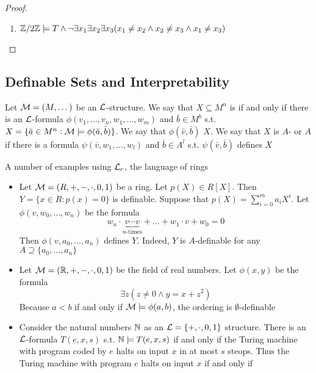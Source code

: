 \documentclass[11pt]{article}
\begin{document}
\begin{proof}
\begin{enumerate}
\item \(\mathbb{Z}/2\mathbb{Z}\models T\wedge\neg\exists x_1\exists x_2\exists x_3(x_1\neq x_2\wedge
      x_2\neq x_3\wedge x_1\neq x_3)\)
\end{enumerate}
\end{proof}
\subsection{Definable Sets and Interpretability}
\label{sec:org377de4b}
\begin{definition}[]
Let \(\mathcal{M}=(M,\dots)\) be an \(\mathcal{L}\)-structure. We say that \(X\subseteq M^n\)
is  if and only if there is an \(\mathcal{L}\)-formula 
\(\phi(v_1,\dots,v_n,w_1,\dots,w_m)\) and \(\bar{b}\in M^b\) s.t. 
\(X=\{\bar{a}\in M^n:\mathcal{M}\models\phi(\bar{a},\bar{b})\}\). We say that
\(\phi(\bar{v},\bar{b})\)  \(X\). We say that \(X\) is
\(A\)- or   \(A\) if there is a formula 
\(\psi(\bar{v},w_1,\dots,w_l)\) and \(\bar{b}\in A^l\) s.t.
\(\psi(\bar{v},\bar{b})\) defines \(X\)
\end{definition}

A number of examples using \(\mathcal{L}_r\), the language of rings
\begin{itemize}
\item Let \(\mathcal{M}=(R,+,-,\cdot,0,1)\) be a ring. Let \(p(X)\in R[X]\). Then 
\(Y=\{x\in R:p(x)=0\}\) is definable. Suppose that
\(p(X)=\displaystyle\sum_{i=0}^ma_iX^i\). Let \(\phi(v,w_0,\dots,w_n)\) be the
formula
\begin{equation*}
w_n\cdot\underbrace{v\cdots v}_{n\text{-times}}+\dots+w_1\cdot v+w_0=0
\end{equation*}
Then \(\phi(v,a_0,\dots,a_n)\) defines \(Y\). Indeed, \(Y\) is \(A\)-definable
for any \(A\supseteq\{a_0,\dots,a_n\}\)
\item Let \(\mathcal{M}=(\mathbb{R},+,-,\cdot,0,1)\) be the field of real numbers. Let
\(\phi(x,y)\) be the formula 
\begin{equation*}
\exists z(z\neq 0\wedge y=x+z^2)
\end{equation*}
Because \(a<b\) if and only if \(\mathcal{M}\models\phi(a,b)\), the ordering is
\(\emptyset\)-definable
\item Consider the natural numbers \(\mathbb{N}\) as an \(\mathcal{L}=\{+,\cdot,0,1\}\) structure.
There is an \(\mathcal{L}\)-formula \(T(e,x,s)\) s.t. \(\mathbb{N}\models T(e,x,s)\) if and
only if the Turing machine with program coded by \(e\) halts on input \(x\) in
at most \(s\) steops. Thus the Turing machine with program \(e\) halts on input
\(x\) if and only if
\end{itemize}
\end{document}

